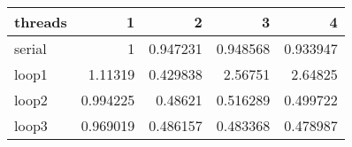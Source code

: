 \begin{tabular}{lrrrr}
\hline
 threads   &        1 &        2 &        3 &        4 \\
\hline
 serial    & 1        & 0.947231 & 0.948568 & 0.933947 \\
 loop1     & 1.11319  & 0.429838 & 2.56751  & 2.64825  \\
 loop2     & 0.994225 & 0.48621  & 0.516289 & 0.499722 \\
 loop3     & 0.969019 & 0.486157 & 0.483368 & 0.478987 \\
\hline
\end{tabular}
